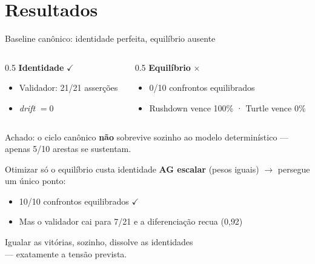 \documentclass[11pt,aspectratio=169]{beamer}
\begin{document}
\section{Resultados}

\begin{frame}{Baseline canônico: identidade perfeita, equilíbrio ausente}
  \begin{columns}[t]
  \begin{column}{0.5\textwidth}
    \textbf{Identidade} \textcolor{mDarkTeal}{$\checkmark$}
    \begin{itemize}
      \item Validador: \alert{21/21} asserções
      \item \emph{drift} $= 0$
    \end{itemize}
  \end{column}
  \begin{column}{0.5\textwidth}
    \textbf{Equilíbrio} \textcolor{kneecol}{$\times$}
    \begin{itemize}
      \item \alert{0/10} confrontos equilibrados
      \item Rushdown vence 100\% · Turtle vence 0\%
    \end{itemize}
  \end{column}
  \end{columns}

  \vfill
  \begin{center}
    Achado: o ciclo canônico \textbf{não} sobrevive sozinho ao modelo
    determinístico --- apenas \alert{5/10} arestas se sustentam.
  \end{center}
\end{frame}

\begin{frame}{Otimizar só o equilíbrio custa identidade}
  \textbf{AG escalar} (pesos iguais) $\rightarrow$ persegue um único ponto:

  \bigskip
  \begin{itemize}
    \item \alert{10/10} confrontos equilibrados \textcolor{mDarkTeal}{$\checkmark$}
    \item Mas o validador cai para \alert{7/21} e a diferenciação recua (0{,}92)
  \end{itemize}

  \vfill
  \begin{center}
    \Large
    Igualar as vitórias, sozinho, \alert{dissolve} as identidades\\
    --- exatamente a tensão prevista.
  \end{center}
\end{frame}
\end{document}
